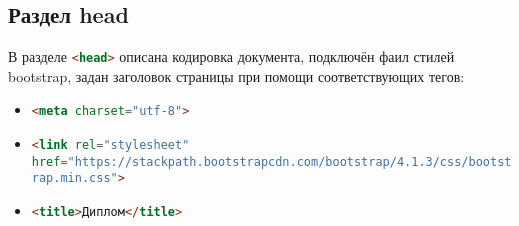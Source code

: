 \subsection{Раздел head}
В разделе \lstinline[language=HTML]{<head>} описана кодировка документа, подключён фаил стилей bootstrap, задан заголовок страницы при помощи соответствующих тегов:
\begin{itemize}
	\item \lstinline[language=HTML]{<meta charset="utf-8">}
	\item \lstinline[language=HTML]{<link rel="stylesheet" href="https://stackpath.bootstrapcdn.com/bootstrap/4.1.3/css/bootstrap.min.css">}
	\item \lstinline[language=HTML]{<title>Диплом</title>}
\end{itemize}